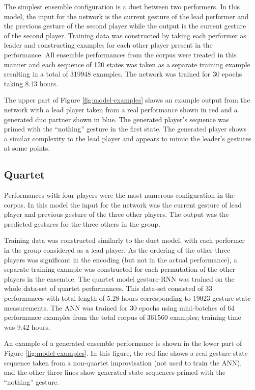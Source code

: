 \documentclass[sigchi]{acmart} %
\begin{document}
The simplest ensemble configuration is a duet between two performers.
In this model, the input for the network is the current gesture of the
lead performer and the previous gesture of the second player while the
output is the current gesture of the second player. Training data was
constructed by taking each performer as leader and constructing
examples for each other player present in the performance. All
ensemble performances from the corpus were treated in this manner and
each sequence of 120 states was taken as a separate training example
resulting in a total of 319948 examples. The network was trained for
30 epochs taking 8.13 hours.

The upper part of Figure \ref{fig:model-examples} shows an example
output from the network with a lead player taken from a real
performance shown in red and a generated duo partner shown in blue.
The generated player's sequence was primed with the ``nothing''
gesture in the first state. The generated player shows a similar
complexity to the lead player and appears to mimic the leader's
gestures at some points.

\subsection{Quartet}

Performances with four players were the most numerous 
configuration in the corpus. In this model the input for the network
was the current gesture of lead player and previous gesture of the
three other players. The output was the predicted gestures for the
three others in the group.

Training data was constructed similarly to the duet model, with each
performer in the group considered as a lead player. As the ordering of
the other three players was significant in the encoding (but not in
the actual performance), a separate training example was constructed
for each permutation of the other players in the ensemble. The quartet
model gesture-RNN was trained on the whole data-set of quartet
performances. This data-set consisted of 33 performances with total
length of 5.28 hours corresponding to 19023 gesture state
measurements. The ANN was trained for 30 epochs using mini-batches of
64 performance examples from the total corpus of 361560 examples;
training time was 9.42 hours.

An example of a generated ensemble performance is shown in the lower
part of Figure \ref{fig:model-examples}. In this figure, the red line
shows a real gesture state sequence taken from a non-quartet
improvisation (not used to train the ANN), and the other three lines
show generated state sequences primed with the ``nothing'' gesture.
\end{document}
